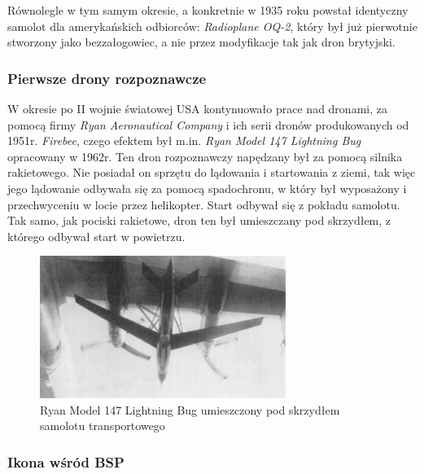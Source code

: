 Równolegle w tym samym okresie, a konkretnie w 1935 roku powstał identyczny samolot dla amerykańskich odbiorców: \textit{Radioplane OQ-2}, który był już pierwotnie stworzony jako bezzałogowiec, a nie przez modyfikacje tak jak dron brytyjski.

\subsubsection{Pierwsze drony rozpoznawcze}
\hspace{1cm}W okresie po II wojnie światowej USA kontynuowało prace nad dronami, za pomocą firmy \textit{Ryan Aeronautical Company} i ich serii dronów produkowanych od 1951r. \textit{Firebee}, czego efektem był m.in. \textit{Ryan Model 147 Lightning Bug} opracowany w 1962r. Ten dron rozpoznawczy napędzany był za pomocą silnika rakietowego. Nie posiadał on sprzętu do lądowania i startowania z ziemi, tak więc jego lądowanie odbywała się za pomocą spadochronu, w który był wyposażony i przechwyceniu w locie przez helikopter. Start odbywał się z pokładu samolotu. Tak samo, jak pociski rakietowe, dron ten był umieszczany pod skrzydłem, z którego odbywał start w powietrzu.\cite{dron-ibuk}\cite{firebee-wiki}


\begin{figure}[!ht]
  \centering
  \includegraphics[width=8cm]{./Obrazy/Model_147_RPV.png}
  \caption{Ryan Model 147 Lightning Bug umieszczony pod skrzydłem samolotu transportowego}
  \end{figure}

\subsubsection{Ikona wśród BSP}

